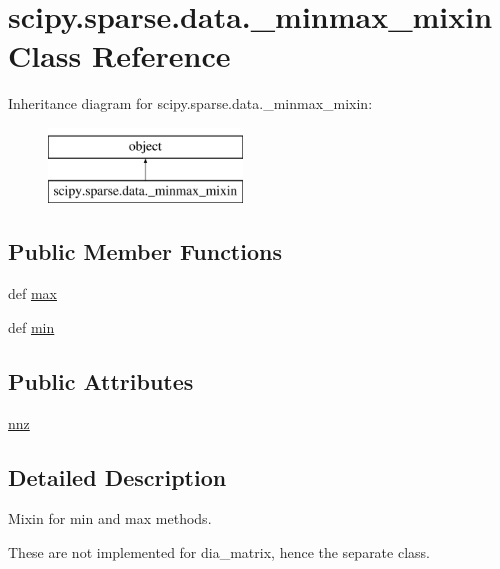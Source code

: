 \hypertarget{classscipy_1_1sparse_1_1data_1_1__minmax__mixin}{}\section{scipy.\+sparse.\+data.\+\_\+minmax\+\_\+mixin Class Reference}
\label{classscipy_1_1sparse_1_1data_1_1__minmax__mixin}
Inheritance diagram for scipy.\+sparse.\+data.\+\_\+minmax\+\_\+mixin\+:\begin{figure}[H]
\begin{center}
\leavevmode
\includegraphics[height=2.000000cm]{classscipy_1_1sparse_1_1data_1_1__minmax__mixin}
\end{center}
\end{figure}
\subsection*{Public Member Functions}
\begin{DoxyCompactItemize}
\item 
def \hyperlink{classscipy_1_1sparse_1_1data_1_1__minmax__mixin_a0d91bad92c9a03ec38c0727588ecdaed}{max}
\item 
def \hyperlink{classscipy_1_1sparse_1_1data_1_1__minmax__mixin_a96347799bb884e609ca8f61e92d6d62e}{min}
\end{DoxyCompactItemize}
\subsection*{Public Attributes}
\begin{DoxyCompactItemize}
\item 
\hyperlink{classscipy_1_1sparse_1_1data_1_1__minmax__mixin_ae693893380c090babe6803e72f8432ac}{nnz}
\end{DoxyCompactItemize}


\subsection{Detailed Description}
\begin{DoxyVerb}Mixin for min and max methods.

These are not implemented for dia_matrix, hence the separate class.
\end{DoxyVerb}
 

